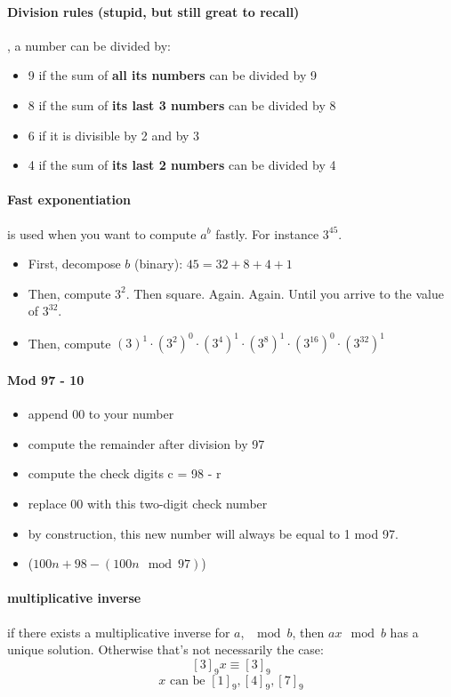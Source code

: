 \documentclass{article}
\begin{document}
\paragraph{Division rules (stupid, but still great to recall)}, a number can be divided by:
\begin{itemize}
    \item 9 if the sum of \textbf{all its numbers} can be divided by 9
    \item 8 if the sum of \textbf{its last 3 numbers} can be divided by 8
    \item 6 if it is divisible by 2 and by 3
    \item 4 if the sum of \textbf{its last 2 numbers} can be divided by 4
\end{itemize}

\paragraph{Fast exponentiation} is used when you want to compute $ a^b $ fastly. For instance $ 3^45 $.
\begin{itemize}
    \item First, decompose $ b $ (binary): $45 = 32 + 8 + 4 + 1$
    \item Then, compute $ 3^2 $. Then square. Again. Again. Until you arrive to the value of $ 3^{32} $.
    \item Then, compute $ (3)^1 \cdot (3^2)^0 \cdot (3^4)^1 \cdot (3^8)^1 \cdot (3^{16})^0 \cdot (3^{32})^1 $
\end{itemize}

\paragraph{Mod 97 - 10}

\begin{itemize}
    \item append 00 to your number
    \item compute the remainder after division by 97
    \item compute the check digits c = 98 - r
    \item replace 00 with this two-digit check number
    \item by construction, this new number will always be equal to 1 mod 97.
    \item ($100n + 98 - (100n \mod 97)$)
\end{itemize}

\paragraph{multiplicative inverse} if there exists a multiplicative inverse for $ a $, $ \mod b $, then $ ax \mod b $ has a unique solution. Otherwise that's not necessarily the case:
\[ [3]_9x \equiv [3]_9 \]
\[ x \text { can be } [1]_9, [4]_9, [7]_9 \]
\end{document}
